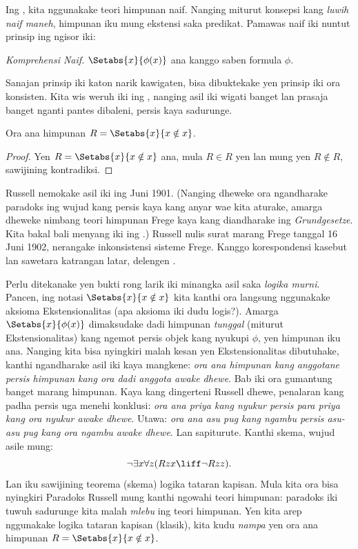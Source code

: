 \documentclass[../../../include/open-logic-section]{subfiles}
\begin{document}

Ing , kita nggunakake teori himpunan naif.
Nanging miturut konsepsi kang \emph{luwih naif maneh}, himpunan
iku mung ekstensi saka predikat. Pamawas naif iki nuntut
prinsip ing ngisor iki:

\begin{defish}
  \emph{Komprehensi Naif.} $\Setabs{x}{\phi(x)}$ ana kanggo
  saben formula $\phi$.
\end{defish}

Sanajan prinsip iki katon narik kawigaten, bisa dibuktekake
yen prinsip iki ora konsisten. Kita wis weruh iki ing
, nanging asil iki wigati banget
lan prasaja banget nganti pantes dibaleni, persis kaya sadurunge.

\begin{thm}
Ora ana himpunan $R = \Setabs{x}{x \notin x}$.
\end{thm}

\begin{proof}
Yen $R = \Setabs{x}{x \notin x}$ ana, mula $R \in R$ yen lan
mung yen $R \notin R$, sawijining kontradiksi.
\end{proof}

Russell nemokake asil iki ing Juni 1901. (Nanging dheweke
ora ngandharake paradoks ing wujud kang persis kaya kang
anyar wae kita aturake, amarga dheweke nimbang teori himpunan
Frege kaya kang diandharake ing \emph{Grundgesetze}. Kita bakal
bali menyang iki ing .) Russell nulis surat
marang Frege tanggal 16 Juni 1902, nerangake inkonsistensi
sisteme Frege. Kanggo korespondensi kasebut lan sawetara
katrangan latar, delengen \citet[pp.~124--8]{Heijenoort1967}.

Perlu ditekanake yen bukti rong larik iki minangka asil saka
\emph{logika murni}. Pancen, ing notasi
$\Setabs{x}{x \notin x}$ kita kanthi ora langsung nggunakake
aksioma Ekstensionalitas (apa aksioma iki dudu logis?).
Amarga $\Setabs{x}{\phi(x)}$ dimaksudake dadi himpunan
\emph{tunggal} (miturut Ekstensionalitas) kang ngemot
persis objek kang nyukupi $\phi$, yen himpunan iku ana. Nanging kita bisa
nyingkiri malah kesan yen Ekstensionalitas dibutuhake,
kanthi ngandharake asil iki kaya mangkene: \emph{ora ana
himpunan kang anggotane persis himpunan kang ora dadi
anggota awake dhewe}. Bab iki ora gumantung banget marang
himpunan. Kaya kang dingerteni Russell dhewe, penalaran kang
padha persis uga menehi konklusi: \emph{ora ana priya kang
nyukur persis para priya kang ora nyukur awake dhewe}.
Utawa: \emph{ora ana asu pug kang ngambu persis asu-asu pug
kang ora ngambu awake dhewe}. Lan sapiturute. Kanthi skema,
wujud asile mung:
\[
\lnot \exists x \forall z(Rzx \liff \lnot R zz).
\]
Lan iku sawijining teorema (skema) logika tataran kapisan.
Mula kita ora bisa nyingkiri Paradoks Russell mung kanthi
ngowahi teori himpunan: paradoks iki tuwuh sadurunge kita
malah \emph{mlebu} ing teori himpunan. Yen kita arep nggunakake
logika tataran kapisan (klasik), kita kudu \emph{nampa}
yen ora ana himpunan $R = \Setabs{x}{x\notin x}$.
\end{document}
